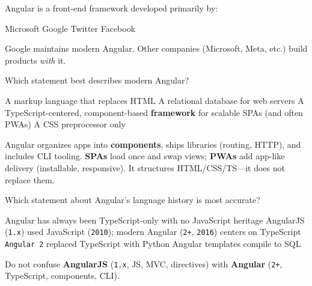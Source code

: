 



\question[4]
Angular is a front-end framework developed primarily by:
\begin{choices}
  \choice Microsoft
  \CorrectChoice Google
  \choice Twitter
  \choice Facebook
\end{choices}
\begin{solution}
  Google maintains modern Angular. Other companies (Microsoft, Meta, etc.) build products \emph{with} it.
\end{solution}

\question[4]
Which statement best describes modern Angular?
\begin{choices}
  \choice A markup language that replaces HTML
  \choice A relational database for web servers
  \CorrectChoice A TypeScript-centered, component-based \textbf{framework} for scalable SPAs (and often PWAs)
  \choice A CSS preprocessor only
\end{choices}
\begin{solution}
  Angular organizes apps into \textbf{components}, ships libraries (routing, HTTP), and includes CLI tooling. \textbf{SPAs} load once and swap views; \textbf{PWAs} add app-like delivery (installable, responsive). It structures HTML/CSS/TS---it does not replace them.
\end{solution}

\question[4]
Which statement about Angular's language history is most accurate?
\begin{choices}
  \choice Angular has always been TypeScript-only with no JavaScript heritage
  \CorrectChoice AngularJS (\texttt{1.x}) used JavaScript (\texttt{2010}); modern Angular (\texttt{2+}, \texttt{2016}) centers on TypeScript
  \choice \texttt{Angular~2} replaced TypeScript with Python
  \choice Angular templates compile to SQL
\end{choices}
\begin{solution}
  Do not confuse \textbf{AngularJS} (\texttt{1.x}, JS, MVC, directives) with \textbf{Angular} (\texttt{2+}, TypeScript, components, CLI).
\end{solution}

